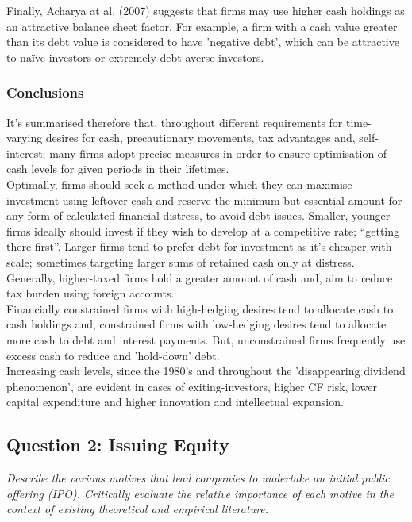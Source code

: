 \documentclass[11pt, english]{article}
\begin{document}
	Finally, Acharya at al. (2007) suggests that firms may use higher cash holdings as an attractive balance sheet factor. For example, a firm with a cash value greater than its debt value is considered to have 'negative debt', which can be attractive to naïve investors or extremely debt-averse investors.

		\subsubsection*{Conclusions}

	It's summarised therefore that, throughout different requirements for time- varying desires for cash, precautionary movements, tax advantages and, self- interest; many firms adopt precise measures in order to ensure optimisation of cash levels for given periods in their lifetimes.\\

	Optimally, firms should seek a method under which they can maximise investment using leftover cash and reserve the minimum but essential amount for any form of calculated financial distress, to avoid debt issues. Smaller, younger firms ideally should invest if they wish to develop at a competitive rate; ``getting there first''. Larger firms tend to prefer debt for investment as it's cheaper with scale; sometimes targeting larger sums of retained cash only at distress. Generally, higher-taxed firms hold a greater amount of cash and, aim to reduce tax burden using foreign accounts.\\

	Financially constrained firms with high-hedging desires tend to allocate cash to cash holdings and, constrained firms with low-hedging desires tend to allocate more cash to debt and interest payments. But, unconstrained firms frequently use excess cash to reduce and 'hold-down' debt.\\

	Increasing cash levels, since the 1980's and throughout the 'disappearing dividend phenomenon', are evident in cases of exiting-investors, higher CF risk, lower capital expenditure and higher innovation and intellectual expansion.

	\newpage

	\subsection{Question 2: Issuing Equity}

	\textit{Describe the various motives that lead companies to undertake an initial public offering (IPO). Critically evaluate the relative importance of each motive in the context of existing theoretical and empirical literature.}
\end{document}
